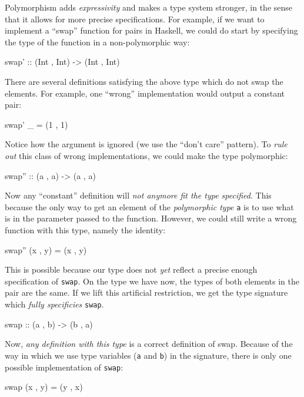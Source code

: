            Polymorphism adds \emph{expressivity} and makes a type system stronger,
            in the sense that it allows for more precise specifications.
            For example, if we want to implement a ``swap'' function for pairs in Haskell,
            we could do start by specifying the type of the function in a non-polymorphic way:
            \begin{haskellcode}
        swap' :: (Int , Int) -> (Int , Int)
            \end{haskellcode}

            There are several definitions satisfying the above type which do not swap the elements.
            For example, one ``wrong'' implementation would output a constant pair:
            \begin{haskellcode}
        swap' _ = (1 , 1)
            \end{haskellcode}

            Notice how the argument is ignored (we use the ``don't care'' pattern).
            To \emph{rule out} this class of wrong implementations, we could make the type polymorphic:
            \begin{haskellcode}
        swap'' :: (a , a) -> (a , a)
            \end{haskellcode}

            Now any ``constant'' definition will \emph{not anymore fit the type specified}.
            This because the only way to get an element of the \emph{polymorphic type} \texttt{a}
            is to use what is in the parameter passed to the function.
            However, we could still write a wrong function with this type, namely the identity:
            \begin{haskellcode}
        swap'' (x , y) = (x , y)
            \end{haskellcode}

            This is possible because our type does not \emph{yet} reflect a precise enough specification of \texttt{swap}.
            On the type we have now, the types of both elements in the pair are the same.
            If we lift this artificial restriction, we get the type signature which \emph{fully specificies} \texttt{swap}.
            \begin{haskellcode}
        swap :: (a , b) -> (b , a)
            \end{haskellcode}

            Now, \emph{any definition with this type} is a correct definition of swap.
            Because of the way in which we use type variables (\texttt{a} and \texttt{b}) in the signature,
            there is only one possible implementation of \texttt{swap}:
            \begin{haskellcode}
        swap (x , y) = (y , x)
            \end{haskellcode}

